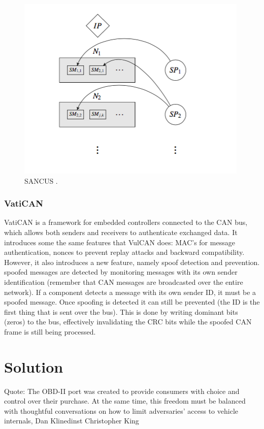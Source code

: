 \documentclass[11pt]{article}
\begin{document}
\begin{figure}[h]
	\label{fig:SANCUS}
	\centering
	\includegraphics[width=\textwidth]{SANCUS.png}
	\caption{SANCUS \cite{MillerC}.}
\end{figure} 

\subsubsection{VatiCAN} VatiCAN is a framework for embedded controllers connected to the CAN bus, which allows both senders and receivers to authenticate exchanged data. It introduces some the same features that VulCAN does: MAC's for message authentication, nonces to prevent replay attacks and backward compatibility. However, it also introduces a new feature, namely spoof detection and prevention. spoofed messages are detected by monitoring messages with its own sender identification (remember that CAN messages are broadcasted over the entire network). If a component detects a message with its own sender ID, it must be a spoofed message. Once spoofing is detected it can still be prevented (the ID is the first thing that is sent over the bus). This is done by writing dominant bits (zeros) to the bus, effectively invalidating the CRC bits while the spoofed CAN frame is still being processed.\cite{VatiCAN}

\section{Solution}
Quote: The OBD-II port was created to provide consumers with choice and control over their purchase. At the same time, this freedom must be balanced with thoughtful conversations on how to limit adversaries’ access to vehicle internals, Dan Klinedinst Christopher King
\end{document}
